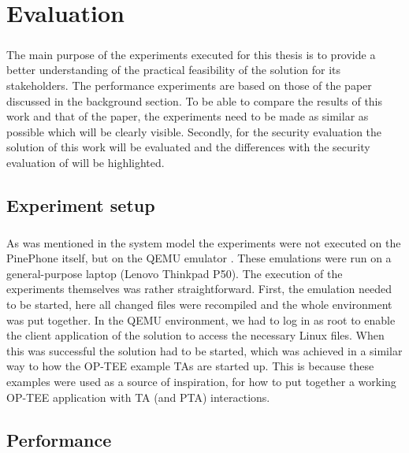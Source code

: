 \chapter{Evaluation}

\paragraph*{}
The main purpose of the experiments executed for this thesis is to provide a better understanding of the practical feasibility of the solution for its stakeholders. The performance experiments are based on those of the paper \cite{LingZhen2021Sbtb} discussed in the background section. To be able to compare the results of this work and that of the paper, the experiments need to be made as similar as possible which will be clearly visible. Secondly, for the security evaluation the solution of this work will be evaluated and the differences with the security evaluation of \cite{LingZhen2021Sbtb} will be highlighted.

\section{Experiment setup}

\paragraph*{}
As was mentioned in the system model the experiments were not executed on the PinePhone itself, but on the QEMU emulator \cite{QEMU}. These emulations were run on a general-purpose laptop (Lenovo Thinkpad P50). The execution of the experiments themselves was rather straightforward. First, the emulation needed to be started, here all changed files were recompiled and the whole environment was put together. In the QEMU environment, we had to log in as root to enable the client application of the solution to access the necessary Linux files. When this was successful the solution had to be started, which was achieved in a similar way to how the OP-TEE example TAs are started up. This is because these examples were used as a source of inspiration, for how to put together a working OP-TEE application with TA (and PTA) interactions. 

\section{Performance}

